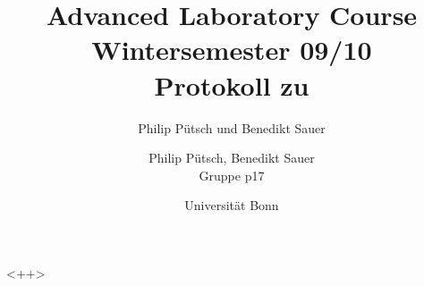 \documentclass[a4paper,oneside,toc=bibliography]{scrartcl}
\author{Philip Pütsch und Benedikt Sauer}
\title{\Large{Advanced Laboratory Course}\\
                \vspace{0.5cm}\textnormal{Wintersemester 09/10}\\
                \vspace{2cm}\large\textnormal{Protokoll zu}\\
                \vspace{0.5cm}\Huge{\Versuch}\vspace{1cm}
        }
\author{Philip Pütsch, Benedikt Sauer\\
                Gruppe p17\\
        }
\date{\vspace{1cm} Universität Bonn \\ \Datum}
\begin{document}
<++>
\end{document}
